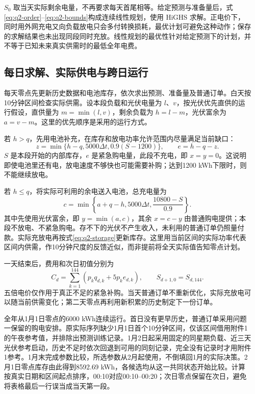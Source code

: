 $S_0$ 取当天实际剩余电量，不再要求每天首尾相等。给定预测与准备量后，式\eqref{eq:q2-order}--\eqref{eq:q2-bounds}构成连续线性规划，使用 HiGHS 求解。正电价下，同时用外网充电又向负载放电只会多付转换损耗，最优计划可避免这种动作；保存的求解结果也未出现同段同时充放。线性规划的最优性针对给定预测下的计划，并不等于已知未来真实供需时的最低全年电费。

\subsection{每日求解、实际供电与跨日运行}

每天零点先更新历史数据和电池库存，依次求出预测、准备量及普通订单。白天按10分钟区间检查实际供需。设本段负载和光伏电量为 $l$、$v$，按光伏优先直供的运行假设，直供量为 $m=\min(l,v)$，剩余负载为 $h=l-m$，光伏富余为 $a=v-m$。这里的优先顺序是采用的运行方式。

若 $h>q$，先用电池补充，在库存和放电功率允许范围内尽量满足当前缺口：
\begin{equation}
z=\min\{h-q,5000\Delta t,0.9(S-1200)\},\qquad e=h-q-z.
\label{eq:q2-emergency}
\end{equation}
$S$ 是本段开始的内部库存，$e$ 是紧急购电量，此段不充电，即 $x=y=0$。这说明即使电池里还有电，放电速度不够快也可能需要补购；达到1200 kWh下限时，则不能继续放电。

若 $h\le q$，将实际可利用的余电送入电池，总充电量为
\begin{equation}
c=\min\left\{a+q-h,5000\Delta t,\frac{10800-S}{0.9}\right\}.
\end{equation}
其中先使用光伏富余，即 $y=\min(a,c)$，其余 $x=c-y$ 由普通购电提供；本段不放电、不紧急购电。存不下的光伏不产生收入，未利用的普通订单仍照量付款。实际充放电再按式\eqref{eq:q2-storage}更新库存。这里用当前区间的实际功率代表区间内供需，作10分钟尺度的反馈近似，而非提前将全天实际值告知零点计划。

一天结束后，费用和次日初值分别为
\begin{equation}
C_d=\sum_{k=1}^{144}\left(p_kq_{d,k}+5p_ke_{d,k}\right),\qquad
S_{d+1,0}=S_{d,144}.
\label{eq:q2-bill}
\end{equation}
五倍电价仅作用于真正不足的紧急补购。当天普通订单不重新优化，实际充放电可以随当前供需变化；第二天零点再利用新积累的历史制定下一份订单。

全年从1月1日零点的6000 kWh连续运行。首日没有更早历史，普通订单采用问题一保留的购电安排。原实际序列缺少1月1日首个10分钟区间，仅该区间借用附件1的午夜参考值，并排除出预测训练记录。1月2日起采用固定的同星期负载、近三天光伏参考启动，历史不足时依次回退到可用的同刻记录，完全没有记录时才用附件1参考。1月末完成参数比较，所选参数从2月起使用，不倒填回1月的实际决策。2月1日零点库存由此得到8592.69 kWh，各候选均从这一共同状态开始比较。计算按真实日期和区间起点排序，00:10对应00:10--00:20；次日零点保留在次日，避免将表格最后一行误当成当天第一段。

